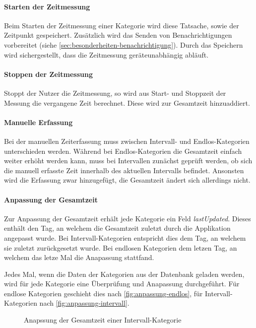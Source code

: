 \paragraph{Starten der Zeitmessung}
Beim Starten der Zeitmessung einer Kategorie wird diese Tatsache,
sowie der Zeitpunkt gespeichert.
Zusätzlich wird das Senden von Benachrichtigungen vorbereitet (siehe \autoref{sec:besonderheiten-benachrichtigung}).
Durch das Speichern wird sichergestellt, dass die Zeitmessung geräteunabhängig abläuft.

\paragraph{Stoppen der Zeitmessung}
Stoppt der Nutzer die Zeitmessung,
so wird aus Start- und Stoppzeit der Messung die vergangene Zeit berechnet.
Diese wird zur Gesamtzeit hinzuaddiert.

\paragraph{Manuelle Erfassung}
Bei der manuellen Zeiterfassung muss zwischen Intervall- und Endlos-Kategorien unterschieden werden.
Während bei Endlos-Kategorien die Gesamtzeit einfach weiter erhöht werden kann,
muss bei Intervallen zunächst geprüft werden,
ob sich die manuell erfasste Zeit innerhalb des aktuellen Intervalls befindet.
Ansonsten wird die Erfassung zwar hinzugefügt,
die Gesamtzeit ändert sich allerdings nicht.

\paragraph{Anpassung der Gesamtzeit}
Zur Anpassung der Gesamtzeit erhält jede Kategorie ein Feld \emph{lastUpdated}.
Dieses enthält den Tag, an welchem die Gesamtzeit zuletzt durch die Applikation angepasst wurde.
Bei Intervall-Kategorien entspricht dies dem Tag, an welchem sie zuletzt zurückgesetzt wurde.
Bei endlosen Kategorien dem letzen Tag, an welchem das letze Mal die Anapassung stattfand.

Jedes Mal, wenn die Daten der Kategorien aus der Datenbank geladen werden,
wird für jede Kategorie eine Überprüfung und Anapassung durchgeführt.
Für endlose Kategorien geschieht dies nach \autoref{fig:anpassung-endlos},
für Intervall-Kategorien nach \autoref{fig:anpassung-intervall}.
\begin{figure}[ht!]
    \centering
    \resizebox{0.5\textwidth}{!}{
        
    }
	\caption{Anapssung der Gesamtzeit einer Intervall-Kategorie}
    \label{fig:anpassung-intervall}
\end{figure}

